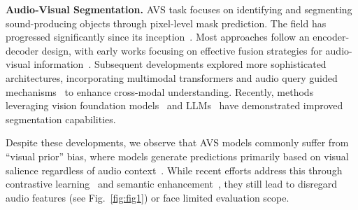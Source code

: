 \vspace{2mm}
\noindent
\textbf{Audio-Visual Segmentation.}
AVS task focuses on identifying and segmenting sound-producing objects through pixel-level mask prediction. 
The field has progressed significantly since its inception~\cite{zhou2022audio,gao2024avsegformer, li2023catr, chen2024cavp, liu2024annofree, ma2024stepping, wang2024GAVS, guo2024open, sun2024biasinAVS}. Most approaches follow an encoder-decoder design, with early works focusing on effective fusion strategies for audio-visual information~\cite{zhou2022audio}. Subsequent developments explored more sophisticated architectures, incorporating multimodal transformers and audio query guided mechanisms~\cite{gao2024avsegformer, liu2023AuTR, sun2024biasinAVS, wang2024ref, li2023catr, ma2024stepping, yang2024combo} to enhance cross-modal understanding. Recently, methods leveraging vision foundation models~\cite{liu2024annofree, wang2024GAVS, sun2024biasinAVS} and LLMs~\cite{wang2024can, he2024mlmseg}  have demonstrated improved segmentation capabilities. 


Despite these developments, we observe that AVS models commonly suffer from ``visual prior'' bias, where models generate predictions primarily based on visual salience regardless of audio context~\cite{sun2024biasinAVS, chen2024cavp, li2024qdformer}. While recent efforts address this through contrastive learning~\cite{chen2024cavp} and semantic enhancement~\cite{sun2024biasinAVS, li2024qdformer}, they still lead to disregard audio features (see Fig.~\ref{fig:fig1}) or face limited evaluation scope. 

